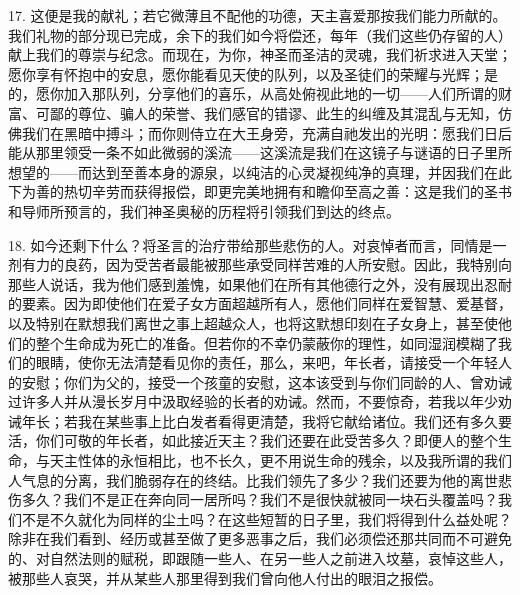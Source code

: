 17. 这便是我的献礼；若它微薄且不配他的功德，天主喜爱那按我们能力所献的。我们礼物的部分现已完成，余下的我们如今将偿还，每年（我们这些仍存留的人）献上我们的尊崇与纪念。而现在，为你，神圣而圣洁的灵魂，我们祈求进入天堂；愿你享有怀抱中的安息，愿你能看见天使的队列，以及圣徒们的荣耀与光辉；是的，愿你加入那队列，分享他们的喜乐，从高处俯视此地的一切——人们所谓的财富、可鄙的尊位、骗人的荣誉、我们感官的错谬、此生的纠缠及其混乱与无知，仿佛我们在黑暗中搏斗；而你则侍立在大王身旁，充满自祂发出的光明：愿我们日后能从那里领受一条不如此微弱的溪流——这溪流是我们在这镜子与谜语的日子里所想望的——而达到至善本身的源泉，以纯洁的心灵凝视纯净的真理，并因我们在此下为善的热切辛劳而获得报偿，即更完美地拥有和瞻仰至高之善：这是我们的圣书和导师所预言的，我们神圣奥秘的历程将引领我们到达的终点。\par

18. 如今还剩下什么？将圣言的治疗带给那些悲伤的人。对哀悼者而言，同情是一剂有力的良药，因为受苦者最能被那些承受同样苦难的人所安慰。因此，我特别向那些人说话，我为他们感到羞愧，如果他们在所有其他德行之外，没有展现出忍耐的要素。因为即使他们在爱子女方面超越所有人，愿他们同样在爱智慧、爱基督，以及特别在默想我们离世之事上超越众人，也将这默想印刻在子女身上，甚至使他们的整个生命成为死亡的准备。但若你的不幸仍蒙蔽你的理性，如同湿润模糊了我们的眼睛，使你无法清楚看见你的责任，那么，来吧，年长者，请接受一个年轻人的安慰；你们为父的，接受一个孩童的安慰，这本该受到与你们同龄的人、曾劝诫过许多人并从漫长岁月中汲取经验的长者的劝诫。然而，不要惊奇，若我以年少劝诫年长；若我在某些事上比白发者看得更清楚，我将它献给诸位。我们还有多久要活，你们可敬的年长者，如此接近天主？我们还要在此受苦多久？即便人的整个生命，与天主性体的永恒相比，也不长久，更不用说生命的残余，以及我所谓的我们人气息的分离，我们脆弱存在的终结。比我们领先了多少？我们还要为他的离世悲伤多久？我们不是正在奔向同一居所吗？我们不是很快就被同一块石头覆盖吗？我们不是不久就化为同样的尘土吗？在这些短暂的日子里，我们将得到什么益处呢？除非在我们看到、经历或甚至做了更多恶事之后，我们必须偿还那共同而不可避免的、对自然法则的赋税，即跟随一些人、在另一些人之前进入坟墓，哀悼这些人，被那些人哀哭，并从某些人那里得到我们曾向他人付出的眼泪之报偿。\par

